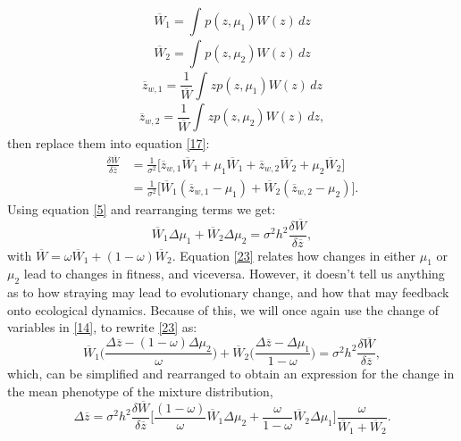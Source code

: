 \documentclass[a4paper]{article}
\begin{document}
\begin{equation}\label{18}
\overline{W}_{1}=\int_{} p(z,\mu_{1})W(z)\,dz 
\end{equation}
\begin{equation}\label{19}
\overline{W}_{2}=\int_{} p(z,\mu_{2})W(z)\,dz  
\end{equation}
\begin{equation}\label{20}
\overline{z}_{w,1}=\frac{1}{\overline{W}}\int_{}zp(z,\mu_{1})W(z)\,dz
\end{equation}
\begin{equation}\label{21}
\overline{z}_{w,2}=\frac{1}{\overline{W}}\int_{}zp(z,\mu_{2})W(z)\,dz, 
\end{equation}
then replace them into equation \ref{17}:
\begin{equation}\label{22}
\begin{aligned}
\frac{\delta \overline{W}}{\delta \overline{z}} &=\frac{1}{\sigma^{2}}\Big[\overline{z}_{w,1} \overline{W}_{1} + \mu_{1}\overline{W}_{1} + \overline{z}_{w,2} \overline{W}_{2} + \mu_{2}\overline{W}_{2}\Big]  \\ 
&= \frac{1}{\sigma^{2}}\Big[ \overline{W}_{1}(\overline{z}_{w,1}-\mu_{1}) + \overline{W}_{2}(\overline{z}_{w,2}-\mu_{2})\Big].
\end{aligned}
\end{equation}
Using equation \ref{5} and rearranging terms we get:
\begin{equation}\label{23}
\overline{W}_{1}\Delta \mu_{1} + \overline{W}_{2}\Delta\mu_{2} = \sigma^{2}h^{2}\frac{\delta \overline{W}}{\delta \overline{z}} ,
\end{equation}
with $\overline{W}=\omega\overline{W}_{1}+(1-\omega)\overline{W}_{2}$. Equation \ref{23} relates how changes in either $\mu_{1}$ or $\mu_{2}$ lead to changes in fitness, and viceversa. However, it doesn't tell us anything as to how straying may lead to evolutionary change, and how that may feedback onto ecological dynamics. Because of this, we will once again use the change of variables in \ref{14}, to rewrite \ref{23} as:
\begin{equation}\label{24}
\overline{W}_{1}\Big(\frac{\Delta\overline{z}-(1-\omega)\Delta\mu_{2}}{\omega} \Big)+\overline{W}_{2}\Big(\frac{\Delta\overline{z}-\Delta\mu_{1}}{1-\omega} \Big)= \sigma^{2}h^{2}\frac{\delta \overline{W}}{\delta \overline{z}}, 
\end{equation}
which, can be simplified and rearranged to obtain an expression for the change in the mean phenotype of the mixture distribution,
\begin{equation}\label{25}
\Delta\overline{z}=\sigma^{2}h^{2}\frac{\delta \overline{W}}{\delta \overline{z}}\Big[\frac{(1-\omega)}{\omega}\overline{W}_{1}\Delta\mu_{2}+\frac{\omega}{1-\omega}\overline{W}_{2}\Delta\mu_{1} \Big]\frac{\omega}{\overline{W}_{1}+\overline{W}_{2}}.
\end{equation}
\end{document}
